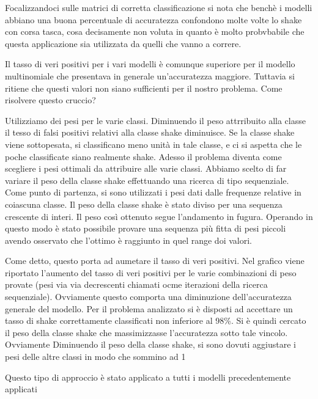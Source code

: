 %
Focalizzandoci sulle matrici di corretta classificazione si nota che benchè i modelli abbiano una buona percentuale di accuratezza confondono molte volte lo shake con corsa tasca, cosa decisamente non voluta in quanto è molto probvbabile che questa applicazione sia utilizzata da quelli che vanno a correre. 
%

%
Il tasso di veri positivi per i vari modelli è comunque superiore per il modello multinomiale che presentava in generale un'accuratezza maggiore. Tuttavia si ritiene che questi valori non siano sufficienti per il nostro problema. Come risolvere questo cruccio?
%

%
Utilizziamo dei pesi per le varie classi. Diminuendo il peso attrribuito alla classe il tesso di falsi positivi relativi alla classe shake diminuisce.
Se la classe shake viene sottopesata, si classificano meno unità in tale classe, e ci si aspetta che le poche classificate siano realmente shake. 
Adesso il problema diventa come scegliere i pesi ottimali da attribuire alle varie classi. Abbiamo scelto di far variare il peso della classe shake effettuando una ricerca di tipo sequenziale. Come punto di partenza, si sono utilizzati i pesi dati dalle frequenze relative in coiascuna classe. Il peso della classe shake è stato diviso per una sequenza crescente di interi. Il peso così ottenuto segue l\rq{}andamento in fugura. Operando in questo modo è stato possibile provare una sequenza più fitta di pesi piccoli avendo osservato che l\rq{}ottimo è raggiunto in quel range doi valori.
%

%
Come detto, questo porta ad aumetare il tasso di veri positivi. Nel grafico viene riportato l\rq{}aumento del tasso di veri positivi per le varie combinazioni di peso provate (pesi via via decrescenti chiamati ocme iterazioni della ricerca sequenziale).
Ovviamente questo comporta una diminuzione dell\rq{}accuratezza generale del modello. Per il problema analizzato si è disposti ad accettare un tasso di shake correttamente classificati non inferiore al 98\%. Si è quindi cercato il peso della classe shake che massimizzasse l\rq{}accuratezza sotto tale vincolo.
Ovviamente Diminuendo il peso della classe shake, si sono dovuti aggiustare i pesi delle altre classi in modo che sommino ad 1
%

%
Questo tipo di approccio è stato applicato a tutti i modelli precedentemente applicati
